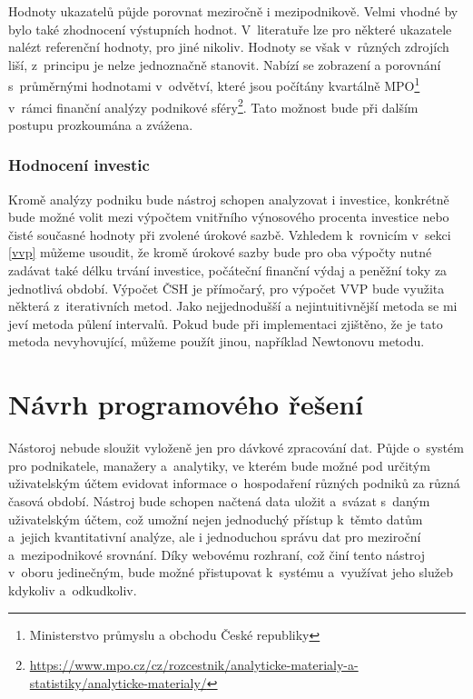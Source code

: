 Hodnoty ukazatelů půjde porovnat meziročně i mezipodnikově. Velmi vhodné by bylo také zhodnocení výstupních hodnot. V~literatuře lze pro některé ukazatele nalézt referenční hodnoty, pro jiné nikoliv. Hodnoty se však v~různých zdrojích liší, z~principu je nelze jednoznačně stanovit. Nabízí se zobrazení a porovnání s~průměrnými hodnotami v~odvětví, které jsou počítány kvartálně MPO\footnote{Ministerstvo průmyslu a obchodu České republiky} v~rámci finanční analýzy podnikové sféry\footnote{\url{https://www.mpo.cz/cz/rozcestnik/analyticke-materialy-a-statistiky/analyticke-materialy/}}. Tato možnost bude při dalším postupu prozkoumána a zvážena.


\subsubsection{Hodnocení investic}
Kromě analýzy podniku bude nástroj schopen analyzovat i investice, konkrétně bude možné volit mezi výpočtem vnitřního výnosového procenta investice nebo čisté současné hodnoty při zvolené úrokové sazbě. Vzhledem k~rovnicím v~sekci \ref{vvp} můžeme usoudit, že kromě úrokové sazby bude pro oba výpočty nutné zadávat také délku trvání investice, počáteční finanční výdaj a peněžní toky za jednotlivá období. Výpočet ČSH je přímočarý, pro výpočet VVP bude využita některá z~iterativních metod. Jako nejjednodušší a nejintuitivnější metoda se mi jeví metoda půlení intervalů. Pokud bude při implementaci zjištěno, že je tato metoda nevyhovující, můžeme použít jinou, například Newtonovu metodu.


\section{Návrh programového řešení}

Nástoroj nebude sloužit vyloženě jen pro dávkové zpracování dat. Půjde o~systém pro podnikatele, manažery a~analytiky, ve kterém bude možné pod určitým uživatelským účtem evidovat informace o~hospodaření různých podniků za různá časová období. Nástroj bude schopen načtená data uložit a~svázat s~daným uživatelským účtem, což umožní nejen jednoduchý přístup k~těmto datům a~jejich kvantitativní analýze, ale i jednoduchou správu dat pro meziroční a~mezipodnikové srovnání. Díky webovému rozhraní, což činí tento nástroj v~oboru jedinečným, bude možné přistupovat k~systému a~využívat jeho služeb kdykoliv a~odkudkoliv.

